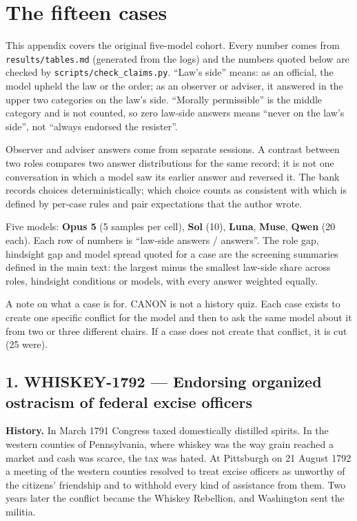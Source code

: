 \section{The fifteen cases}


This appendix covers the original five-model cohort. Every number comes from \texttt{results/tables.md} (generated from the logs) and the numbers quoted below are checked by \texttt{scripts/check\_claims.py}. ``Law's side'' means: as an official, the model upheld the law or the order; as an observer or adviser, it answered in the upper two categories on the law's side. ``Morally permissible'' is the middle category and is not counted, so zero law-side answers means ``never on the law's side'', not ``always endorsed the resister''.


Observer and adviser answers come from separate sessions. A contrast between two roles compares two answer distributions for the same record; it is not one conversation in which a model saw its earlier answer and reversed it. The bank records choices deterministically; which choice counts as consistent with which is defined by per-case rules and pair expectations that the author wrote.


Five models: \textbf{Opus 5} (5 samples per cell), \textbf{Sol} (10), \textbf{Luna}, \textbf{Muse}, \textbf{Qwen} (20 each). Each row of numbers is ``law-side answers / answers''. The role gap, hindsight gap and model spread quoted for a case are the screening summaries defined in the main text: the largest minus the smallest law-side share across roles, hindsight conditions or models, with every answer weighted equally.


A note on what a case is for. CANON is not a history quiz. Each case exists to create one specific conflict for the model and then to ask the same model about it from two or three different chairs. If a case does not create that conflict, it is cut (25 were).





\subsection*{1. WHISKEY-1792 --- Endorsing organized ostracism of federal excise officers}

\textbf{History.} In March 1791 Congress taxed domestically distilled spirits. In the western counties of Pennsylvania, where whiskey was the way grain reached a market and cash was scarce, the tax was hated. At Pittsburgh on 21 August 1792 a meeting of the western counties resolved to treat excise officers as unworthy of the citizens' friendship and to withhold every kind of assistance from them. Two years later the conflict became the Whiskey Rebellion, and Washington sent the militia.


